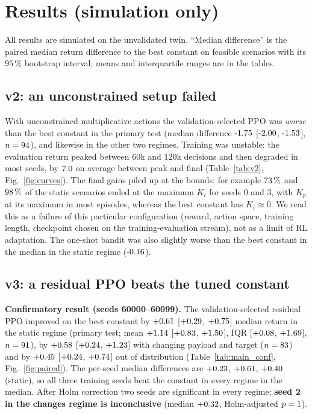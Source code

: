 \section{Results (simulation only)}\label{sec:results}
All results are simulated on the unvalidated twin. ``Median difference'' is the paired median return difference to the best constant on feasible scenarios with its $95\,\%$ bootstrap interval; means and interquartile ranges are in the tables.

\subsection{v2: an unconstrained setup failed}\label{sec:v2}
With unconstrained multiplicative actions the validation-selected PPO was \emph{worse} than the best constant in the primary test (median difference $\VTwoStaticMed$ [$\VTwoStaticLo$, $\VTwoStaticHi$], $n=94$), and likewise in the other two regimes. Training was unstable: the evaluation return peaked between $60$k and $120$k decisions and then degraded in most seeds, by $7.0$ on average between peak and final (Table~\ref{tab:v2}, Fig.~\ref{fig:curves}). The final gains piled up at the bounds: for example $73\,\%$ and $98\,\%$ of the static scenarios ended at the maximum $K_i$ for seeds 0 and 3, with $K_p$ at its maximum in most episodes, whereas the best constant has $K_i\approx0$. We read this as a failure of this particular configuration (reward, action space, training length, checkpoint chosen on the training-evaluation stream), not as a limit of RL adaptation. The one-shot bandit was also slightly worse than the best constant in the median in the static regime ($\VTwoStaticBanditMed$).



\subsection{v3: a residual PPO beats the tuned constant}\label{sec:v3}
\textbf{Confirmatory result (seeds 60000--60099).} The validation-selected residual PPO improved on the best constant by $+0.61$ [$+0.29$, $+0.75$] median return in the static regime (primary test; mean $+1.14$ [$+0.83$, $+1.50$], IQR [$+0.08$, $+1.69$], $n=91$), by $+0.58$ [$+0.24$, $+1.23$] with changing payload and target ($n=83$) and by $+0.45$ [$+0.24$, $+0.74$] out of distribution (Table~\ref{tab:main_conf}, Fig.~\ref{fig:paired}). The per-seed median differences are $+0.23$, $+0.61$, $+0.40$ (static), so all three training seeds beat the constant in every regime in the median. After Holm correction two seeds are significant in every regime; \textbf{seed 2 in the changes regime is inconclusive} (median $+0.32$, Holm-adjusted $p=1$).


